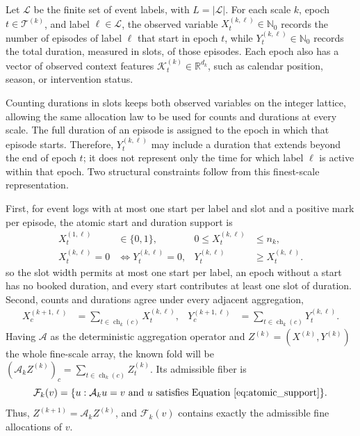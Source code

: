\documentclass[sigconf]{acmart}
\begin{document}
Let \(\mathcal{L}\) be the finite set of event labels, with \(L=\lvert\mathcal{L}\rvert\). For each scale \(k\), epoch \(t \in \mathcal{T}^{(k)}\), and label \(\ell \in \mathcal{L}\), the observed variable \(X_t^{(k,\ell)} \in \mathbb{N}_0\) records the number of episodes of label \(\ell\) that start in epoch \(t\), while \(Y_t^{(k,\ell)} \in \mathbb{N}_0\) records the total duration, measured in slots, of those episodes. Each epoch also has a vector of observed context features \(\mathcal{K}_t^{(k)} \in \mathbb{R}^{d_k}\), such as calendar position, season, or intervention status.

Counting durations in slots keeps both observed variables on the integer lattice, allowing the same allocation law to be used for counts and durations at every scale. The full duration of an episode is assigned to the epoch in which that episode starts. Therefore, \(Y_t^{(k,\ell)}\) may include a duration that extends beyond the end of epoch \(t\); it does not represent only the time for which label \(\ell\) is active within that epoch. Two structural constraints follow from this finest-scale representation.

First, for event logs with at most one start per label and slot and a positive mark per episode, the atomic start and duration support is
\begin{equation}
  \begin{aligned}
    X_t^{(1,\ell)}&\in\{0,1\}, &
    0\leq X_t^{(k,\ell)}&\leq n_k,\\
    X_t^{(k,\ell)}=0&\Longleftrightarrow
    Y_t^{(k,\ell)}=0, &
    Y_t^{(k,\ell)}&\geq X_t^{(k,\ell)}.
  \end{aligned}
  \label{eq:atomic_support}
\end{equation}
so the slot width permits at most one start per label, an epoch without a start has no booked duration, and every start contributes at least one slot of duration. Second, counts and durations agree under every adjacent aggregation,
\begin{align}
  X_c^{(k+1,\ell)}
  &=\sum_{t\in\operatorname{ch}_k(c)}X_t^{(k,\ell)}, &
  Y_c^{(k+1,\ell)}
  &=\sum_{t\in\operatorname{ch}_k(c)}Y_t^{(k,\ell)}.
  \label{eq:aggregation_constraints}
\end{align}
Having \(\mathcal{A}\) as the deterministic aggregation operator and \(Z^{(k)}=(X^{(k)},Y^{(k)})\) the whole fine-scale array, the known fold will be \((\mathcal{A}_kZ^{(k)})_c=\sum_{t\in\operatorname{ch}_k(c)}Z_t^{(k)}\). Its admissible fiber is
\begin{equation*}
  \mathcal F_k(v)=\{u:\mathcal A_ku=v\text{ and }u
  \text{ satisfies Equation~\eqref{eq:atomic_support}}\}.
\end{equation*}
Thus, \(Z^{(k+1)}=\mathcal{A}_kZ^{(k)}\), and \(\mathcal F_k(v)\) contains exactly the admissible fine allocations of \(v\).
\end{document}
